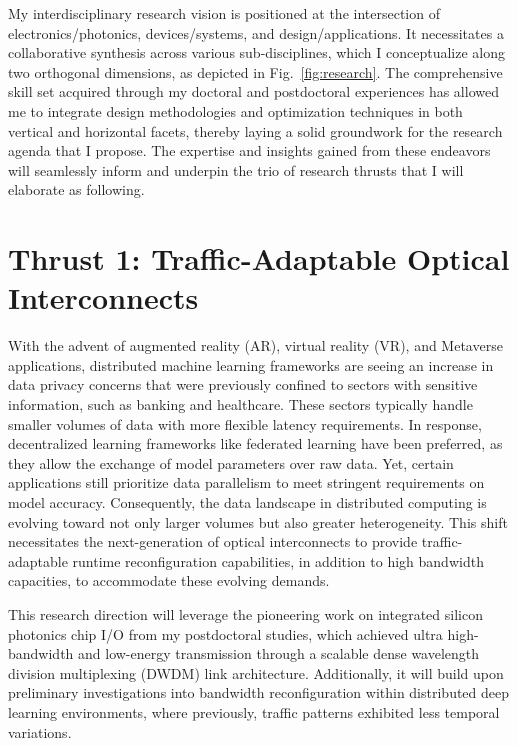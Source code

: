 My interdisciplinary research vision is positioned at the intersection of electronics/photonics, devices/systems, and design/applications. It necessitates a collaborative synthesis across various sub-disciplines, which I conceptualize along two orthogonal dimensions, as depicted in Fig.~\ref{fig:research}. The comprehensive skill set acquired through my doctoral and postdoctoral experiences has allowed me to integrate design methodologies and optimization techniques in both vertical and horizontal facets, thereby laying a solid groundwork for the research agenda that I propose. The expertise and insights gained from these endeavors will seamlessly inform and underpin the trio of research thrusts that I will elaborate as following.

\section{Thrust 1: Traffic-Adaptable Optical Interconnects}

With the advent of augmented reality (AR), virtual reality (VR), and Metaverse applications, distributed machine learning frameworks are seeing an increase in data privacy concerns that were previously confined to sectors with sensitive information, such as banking and healthcare. These sectors typically handle smaller volumes of data with more flexible latency requirements. In response, decentralized learning frameworks like federated learning have been preferred, as they allow the exchange of model parameters over raw data. Yet, certain applications still prioritize data parallelism to meet stringent requirements on model accuracy. Consequently, the data landscape in distributed computing is evolving toward not only larger volumes but also greater heterogeneity. This shift necessitates the next-generation of optical interconnects to provide traffic-adaptable runtime reconfiguration capabilities, in addition to high bandwidth capacities, to accommodate these evolving demands.

This research direction will leverage the pioneering work on integrated silicon photonics chip I/O from my postdoctoral studies\cite{wangScalableArchitectureSubpJ2023}, which achieved ultra high-bandwidth and low-energy transmission through a scalable dense wavelength division multiplexing (DWDM) link architecture. Additionally, it will build upon preliminary investigations into bandwidth reconfiguration within distributed deep learning environments, where previously, traffic patterns exhibited less temporal variations\cite{brianJOCN}.

